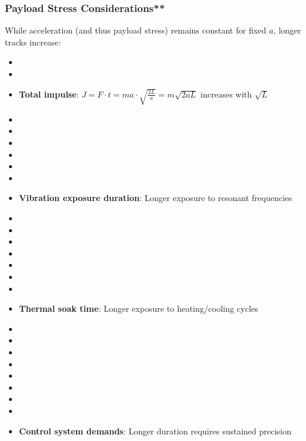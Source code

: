 \subsubsection{Payload Stress Considerations**}
While acceleration (and thus payload stress) remains constant for fixed $a$, longer tracks increase:
\begin{itemize}
    \item \item \item \textbf{Total impulse}: $J = F \cdot t = m a \cdot \sqrt{\frac{2L}{a}} = m \sqrt{2 a L}$ increases with $\sqrt{L}$
    \item \item \item \item \item \item \item \textbf{Vibration exposure duration}: Longer exposure to resonant frequencies
    \item \item \item \item \item \item \item \item \textbf{Thermal soak time}: Longer exposure to heating/cooling cycles
    \item \item \item \item \item \item \item \item \item \textbf{Control system demands}: Longer duration requires sustained precision
\end{itemize}

